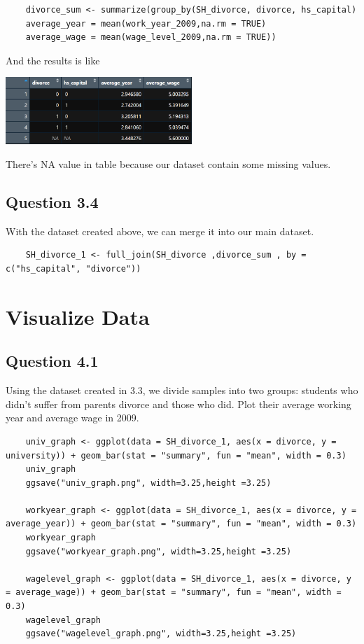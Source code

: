 \documentclass[11pt, letterpaper]{article}
\begin{document}
\begin{lstlisting}
    divorce_sum <- summarize(group_by(SH_divorce, divorce, hs_capital)
    average_year = mean(work_year_2009,na.rm = TRUE)
    average_wage = mean(wage_level_2009,na.rm = TRUE))
\end{lstlisting}

And the results is like
\begin{center}
    \includegraphics[height=1in]{divorce_sum.png}
\end{center}
There's NA value in table because our dataset contain some missing values.

\subsection*{Question 3.4}

With the dataset created above, we can merge it into our main dataset.

\begin{lstlisting}
    SH_divorce_1 <- full_join(SH_divorce ,divorce_sum , by = c("hs_capital", "divorce"))
\end{lstlisting}



\section{Visualize Data}

\subsection*{Question 4.1}

Using the dataset created in 3.3, we divide samples into two groups: students who didn't suffer from parents divorce and those who did.
Plot their average working year and average wage in 2009. 

\begin{lstlisting}
    univ_graph <- ggplot(data = SH_divorce_1, aes(x = divorce, y = university)) + geom_bar(stat = "summary", fun = "mean", width = 0.3)
    univ_graph
    ggsave("univ_graph.png", width=3.25,height =3.25)

    workyear_graph <- ggplot(data = SH_divorce_1, aes(x = divorce, y = average_year)) + geom_bar(stat = "summary", fun = "mean", width = 0.3)
    workyear_graph
    ggsave("workyear_graph.png", width=3.25,height =3.25)

    wagelevel_graph <- ggplot(data = SH_divorce_1, aes(x = divorce, y = average_wage)) + geom_bar(stat = "summary", fun = "mean", width = 0.3)
    wagelevel_graph
    ggsave("wagelevel_graph.png", width=3.25,height =3.25)

\end{lstlisting}
\end{document}
